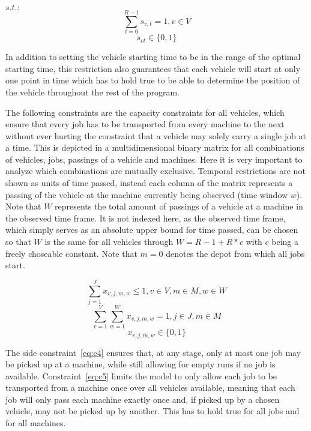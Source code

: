 \(s.t.:\)
\begin{equation} \label{eq:c2}
\sum_{t=0}^{R-1}s_{v,t} = 1, v \in V
\end{equation}
\begin{equation} \label{eq:c3}
s_{v t}\in\{0,1\}
\end{equation}

In addition to setting the vehicle starting time to be in the range of the optimal starting time, this restriction also guarantees that each vehicle
will start at only one point in time which has to hold true to be able to determine the position of the vehicle throughout the rest of the program.

The following constraints are the capacity constraints for all vehicles, which ensure that every job has to be transported from every machine to the
next without ever hurting the constraint that a vehicle may solely carry a single job at a time. This is depicted in a multidimensional binary matrix
for all combinations of vehicles, jobs, passings of a vehicle and machines. Here it is very important to analyze which combinations are mutually exclusive.
Temporal restrictions are not shown as units of time passed, instead each column of the matrix represents a passing of the vehicle at the machine currently
being observed (time window \(w\)). Note that \(W\) represents the total amount of passings of a vehicle at a machine in the observed time frame. It
is not indexed here, as the observed time frame, which simply serves as an absolute upper bound for time passed, can be chosen so that \(W\) is the same
for all vehicles through \(W = R - 1 + R * c\) with \(c\) being a freely choseable constant. Note that \(m = 0\) denotes the depot from which all jobs
start.

\begin{equation} \label{eq:c4}
 \sum_{j=1}^{J}x_{v,j,m,w} \leq 1, v \in V, m \in M, w \in W
\end{equation}
\begin{equation} \label{eq:c5}
 \sum_{v=1}^{V}\sum_{w=1}^{W}x_{v,j,m,w} = 1, j \in J, m \in M
\end{equation}
\begin{equation} \label{eq:c6}
 x_{v,j,m,w} \in \{0,1\}
\end{equation}

The side constraint~\ref{eq:c4} ensures that, at any stage, only at most one job may be picked up at a machine, while still allowing for empty runs if no job
is available. Constraint~\ref{eq:c5} limits the model to only allow each job to be transported from a machine once over all vehicles available, meaning that
each job will only pass each machine exactly once and, if picked up by a chosen vehicle, may not be picked up by another. This has to hold true for all jobs
and for all machines.


